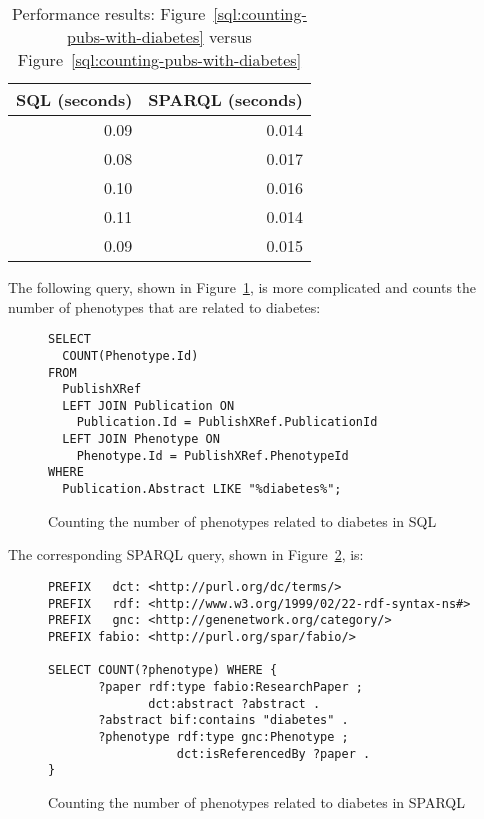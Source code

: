 \begin{table}[H]
\begin{tabular}{rr}
SQL (seconds) & SPARQL (seconds)\\[0pt]
\toprule
0.09 & 0.014\\[0pt]
0.08 & 0.017\\[0pt]
0.10 & 0.016\\[0pt]
0.11 & 0.014\\[0pt]
0.09 & 0.015\\[0pt]
\end{tabular}
\caption{Performance results: Figure~\ref{sql:counting-pubs-with-diabetes} versus Figure~\ref{sql:counting-pubs-with-diabetes} }\label{table:perf-1}
\end{table}

The following query, shown in Figure~\ref{sql:counting-phenotypes-with-diabetes}, is more complicated and counts the number of phenotypes that are related to diabetes:

\begin{figure}[H]
\centering
\begin{verbatim}
SELECT 
  COUNT(Phenotype.Id) 
FROM 
  PublishXRef 
  LEFT JOIN Publication ON
    Publication.Id = PublishXRef.PublicationId 
  LEFT JOIN Phenotype ON
    Phenotype.Id = PublishXRef.PhenotypeId 
WHERE 
  Publication.Abstract LIKE "%diabetes%";
\end{verbatim}
\caption{Counting the number of phenotypes related to diabetes in SQL}\label{sql:counting-phenotypes-with-diabetes}
\end{figure}

The corresponding SPARQL query, shown in Figure~\ref{sparql:counting-phenotypes-with-diabetes}, is:

\begin{figure}[H]
\centering
\begin{verbatim}
PREFIX   dct: <http://purl.org/dc/terms/>
PREFIX   rdf: <http://www.w3.org/1999/02/22-rdf-syntax-ns#>
PREFIX   gnc: <http://genenetwork.org/category/>
PREFIX fabio: <http://purl.org/spar/fabio/>

SELECT COUNT(?phenotype) WHERE {
       ?paper rdf:type fabio:ResearchPaper ;
              dct:abstract ?abstract .
       ?abstract bif:contains "diabetes" .
       ?phenotype rdf:type gnc:Phenotype ;
                  dct:isReferencedBy ?paper .
}
\end{verbatim}
\caption{Counting the number of phenotypes related to diabetes in SPARQL}\label{sparql:counting-phenotypes-with-diabetes}
\end{figure}

